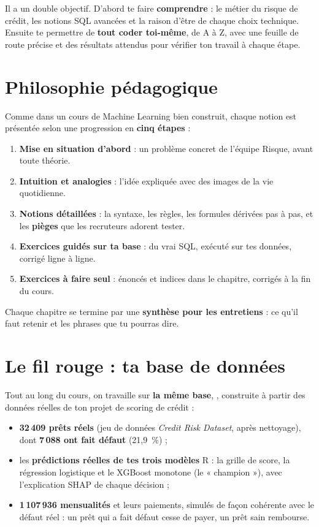 Il a un double objectif. D'abord te faire \textbf{comprendre} : le métier du risque de crédit, les
notions SQL avancées et la raison d'être de chaque choix technique. Ensuite te permettre de
\textbf{tout coder toi-même}, de A à Z, avec une feuille de route précise et des résultats attendus
pour vérifier ton travail à chaque étape.

\section*{Philosophie pédagogique}

Comme dans un cours de Machine Learning bien construit, chaque notion est présentée selon une
progression en \textbf{cinq étapes} :
\begin{enumerate}
\item \textbf{Mise en situation d'abord} : un problème concret de l'équipe Risque, avant toute théorie.
\item \textbf{Intuition et analogies} : l'idée expliquée avec des images de la vie quotidienne.
\item \textbf{Notions détaillées} : la syntaxe, les règles, les formules dérivées pas à pas, et les
\textbf{pièges} que les recruteurs adorent tester.
\item \textbf{Exercices guidés sur ta base} : du vrai SQL, exécuté sur tes données, corrigé ligne à ligne.
\item \textbf{Exercices à faire seul} : énoncés et indices dans le chapitre, corrigés à la fin du cours.
\end{enumerate}
Chaque chapitre se termine par une \textbf{synthèse pour les entretiens} : ce qu'il faut retenir et les
phrases que tu pourras dire.

\section*{Le fil rouge : ta base de données}

Tout au long du cours, on travaille sur \textbf{la même base}, , construite à
partir des données réelles de ton projet de scoring de crédit :
\begin{itemize}
\item \textbf{32\,409 prêts réels} (jeu de données \emph{Credit Risk Dataset}, après nettoyage), dont
\textbf{7\,088 ont fait défaut} (21,9~\%) ;
\item les \textbf{prédictions réelles de tes trois modèles} R : la grille de score, la régression
logistique et le XGBoost monotone (le « champion »), avec l'explication SHAP de chaque décision ;
\item \textbf{1\,107\,936 mensualités} et leurs paiements, simulés de façon cohérente avec le défaut
réel : un prêt qui a fait défaut cesse de payer, un prêt sain rembourse.
\end{itemize}

